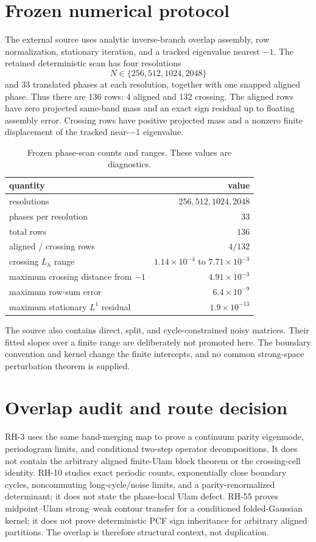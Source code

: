 \documentclass[11pt]{article}
\theoremstyle{definition}
\theoremstyle{remark}
\begin{document}
\section{Frozen numerical protocol}

The external source uses analytic inverse-branch overlap assembly, row
normalization, stationary iteration, and a tracked eigenvalue nearest $-1$.
The retained deterministic scan has four resolutions
\[
 N\in\{256,512,1024,2048\}
\]
and 33 translated phases at each resolution, together with one snapped
aligned phase.  Thus there are 136 rows: 4 aligned and 132 crossing.  The
aligned rows have zero projected same-band mass and an exact sign residual up
to floating assembly error.  Crossing rows have positive projected mass and a
nonzero finite displacement of the tracked near-$-1$ eigenvalue.

\begin{table}[t]
\centering
\caption{Frozen phase-scan counts and ranges.  These values are diagnostics.}
\label{tab:scan}
\begin{tabular}{@{}lr@{}}
\toprule
quantity & value\\
\midrule
resolutions & $256,512,1024,2048$\\
phases per resolution & $33$\\
total rows & $136$\\
aligned / crossing rows & $4/132$\\
crossing $L_h$ range & $1.14\times10^{-4}$ to $7.71\times10^{-3}$\\
maximum crossing distance from $-1$ & $4.91\times10^{-3}$\\
maximum row-sum error & $6.4\times10^{-9}$\\
maximum stationary $L^1$ residual & $1.9\times10^{-13}$\\
\bottomrule
\end{tabular}
\end{table}

The source also contains direct, split, and cycle-constrained noisy matrices.
Their fitted slopes over a finite range are deliberately not promoted here.
The boundary convention and kernel change the finite intercepts, and no
common strong-space perturbation theorem is supplied.

\section{Overlap audit and route decision}

RH-3 uses the same band-merging map to prove a continuum parity eigenmode,
periodogram limits, and conditional two-step operator decompositions.  It
does not contain the arbitrary aligned finite-Ulam block theorem or the
crossing-cell identity.  RH-10 studies exact periodic counts, exponentially
close boundary cycles, noncommuting long-cycle/noise limits, and a
parity-renormalized determinant; it does not state the phase-local Ulam
defect.  RH-55 proves midpoint--Ulam strong--weak contour transfer for a
conditioned folded-Gaussian kernel; it does not prove deterministic PCF sign
inheritance for arbitrary aligned partitions.  The overlap is therefore
structural context, not duplication.
\end{document}
